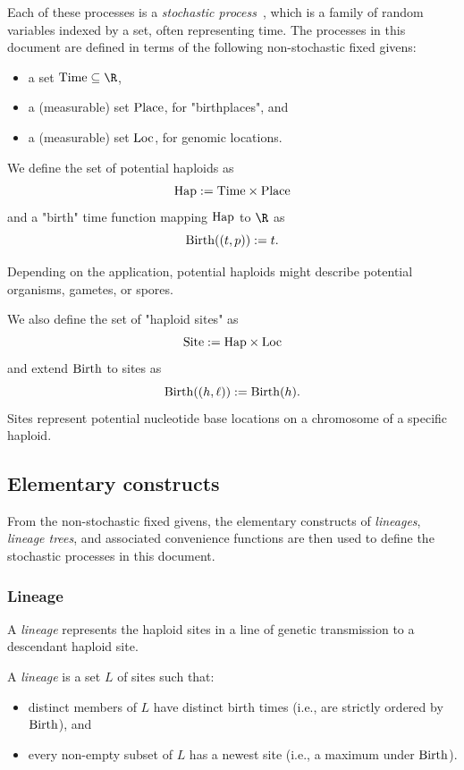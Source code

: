 Each of these processes is a \emph{stochastic process}~\cite{ash_probability_2000, pishro_nik_2014},
which is a family of random variables indexed by a set, often representing time.
The processes in this document are defined in terms of the following non-stochastic
fixed givens:
\begin{itemize}
\item a set $\Time \subseteq \R$,
\item a (measurable) set $\mathrm{Place}$, for "birthplaces", and
\item a (measurable) set $\mathrm{Loc}$, for genomic locations.
\end{itemize}

We define the set of potential haploids as
\[
\mathrm{Hap} := \mathrm{Time} \times \mathrm{Place}
\]
and a "birth" time function mapping $\mathrm{Hap}$ to $\R$ as
\[
  \mathrm{Birth}((t,p)) := t
  \text{.}
\]

Depending on the application, potential haploids might describe potential organisms, gametes, or spores.

We also define the set of "haploid sites" as
\[
\mathrm{Site} := \mathrm{Hap} \times \mathrm{Loc}
\]
and extend $\mathrm{Birth}$ to sites as
\[
  \mathrm{Birth}((h,\ell)) := \mathrm{Birth}(h)
  \text{.}
\]
Sites represent potential nucleotide base locations on a chromosome of a specific haploid.


\subsection{Elementary constructs}

From the non-stochastic fixed givens, the elementary constructs of \emph{lineages},
\emph{lineage trees}, and associated convenience functions are then used to define
the stochastic processes in this document.


\subsubsection{Lineage}

A \emph{lineage} represents the haploid sites in a line of genetic transmission
to a descendant haploid site.

\begin{defin}
A \emph{lineage} is a set $L$ of sites such that:
\begin{itemize}
\item distinct members of $L$ have distinct birth times (i.e., are strictly ordered by $\mathrm{Birth}$), and
\item every non-empty subset of $L$ has a newest site (i.e., a maximum under $\mathrm{Birth}$).
\end{itemize}
\end{defin}

